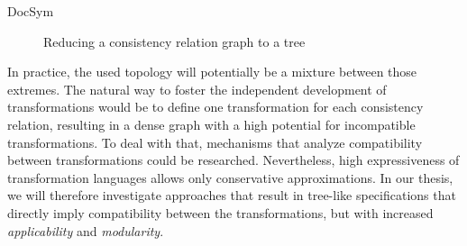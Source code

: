 \begin{copiedFrom}{DocSym}
\begin{figure}[b]
    \centering
    
    \caption{Reducing a consistency relation graph to a tree}
    \label{fig:properties:tree_generation}
\end{figure}

In practice, the used topology will potentially be a mixture between those extremes.
The natural way to foster the independent development of transformations %
would be to define one transformation for each consistency relation, resulting in a dense graph with a high potential for incompatible transformations.
To deal with that, mechanisms that analyze compatibility between transformations could be researched.
Nevertheless, high expressiveness of transformation languages allows only conservative approximations. %
In our thesis, we will therefore investigate approaches that result in tree-like specifications that directly imply compatibility between the transformations, but with increased \emph{applicability} and \emph{modularity}. %








\end{copiedFrom}
